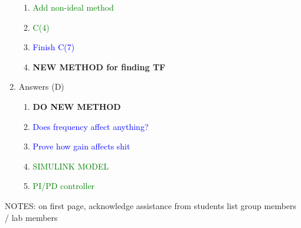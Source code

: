 \documentclass[11pt,a4paper]{article}
\begin{document}
\begin{enumerate}
\begin{enumerate}
		\item \textcolor{green}{Add non-ideal method}
		\item \textcolor{green}{C(4)}
		\item \textcolor{blue}{Finish C(7)}
		\item \textbf{NEW METHOD for finding TF}
	\end{enumerate}
	\item Answers (D) 
	\begin{enumerate}
		\item \textbf{DO NEW METHOD}
		\item \textcolor{blue}{Does frequency affect anything?}
		\item \textcolor{blue}{Prove how gain affects shit}
		\item \textcolor{green}{SIMULINK MODEL}
		\item \textcolor{green}{PI/PD controller}
	\end{enumerate}
\end{enumerate}






NOTES:
on first page, acknowledge assistance from students 
list group members / lab members


\end{document}
